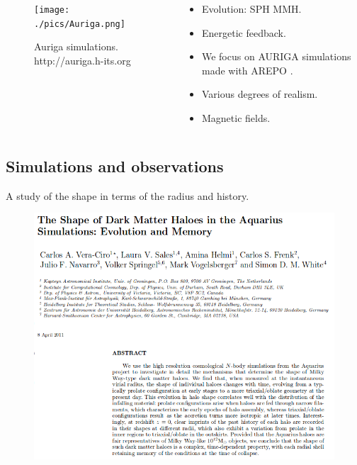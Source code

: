 \documentclass[xcolor=dvipsnames]{beamer}
\begin{document}
\begin{frame}

\begin{columns}[c]

\begin{column}{.5\textwidth}
\begin{figure}
\texttt{[image: ./pics/Auriga.png]}
\caption{\tiny Auriga simulations. http://auriga.h-its.org}
\end{figure}
\end{column}

\begin{column}{.6\textwidth}
\centering
\footnotesize
\begin{itemize}

\item Evolution: SPH MMH.
\item Energetic feedback.
\item We focus on AURIGA \cite{auriga} simulations made with AREPO \cite{arepo}.
\item Various degrees of realism.
\item Magnetic fields.

\end{itemize}

\end{column}

\end{columns}

\end{frame}

\subsection{Simulations and observations}
\begin{frame}

A study of the shape in terms of the radius and history.

\begin{figure}[c]
\includegraphics[width=0.8\linewidth]{./pics/veraCiroAquarius.png}
\end{figure}

\end{frame}
\end{document}
